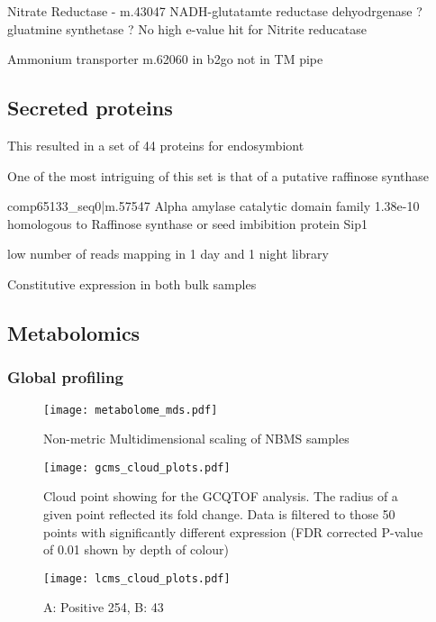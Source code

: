 {{Nitrate Reductase - m.43047  
NADH-glutatamte reductase dehyodrgenase ?
gluatmine synthetase ?
No high e-value hit for Nitrite reducatase

Ammonium transporter m.62060 in b2go not in TM pipe






\subsection{Secreted proteins}

This resulted in a set of 44 proteins for endosymbiont 




One of the most intriguing of this set is that
of a putative raffinose synthase


comp65133\_seq0|m.57547 Alpha amylase catalytic domain family
1.38e-10
homologous to Raffinose synthase or seed imbibition protein Sip1


low number of reads mapping in 1 day and 1 night library

Constitutive expression in both bulk samples 




\subsection{Metabolomics} 

\subsubsection{Global profiling}

\begin{figure}
    \texttt{[image: metabolome\_mds.pdf]}
    \caption{Non-metric Multidimensional scaling of NBMS samples}
    \label{fig:metabolome_nmds}
\end{figure}


\begin{figure}
    \texttt{[image: gcms\_cloud\_plots.pdf]}
    \caption{Cloud point showing for the GCQTOF analysis. 
    The radius of a given point reflected its fold change.
    Data is filtered to those 50 points with significantly 
different expression (FDR corrected P-value of 0.01 shown by 
depth of colour)}
    \label{}
\end{figure}

\begin{figure}
    \texttt{[image: lcms\_cloud\_plots.pdf]}
    \caption{A: Positive 254,  B: 43}
    \label{}
\end{figure}


}}
